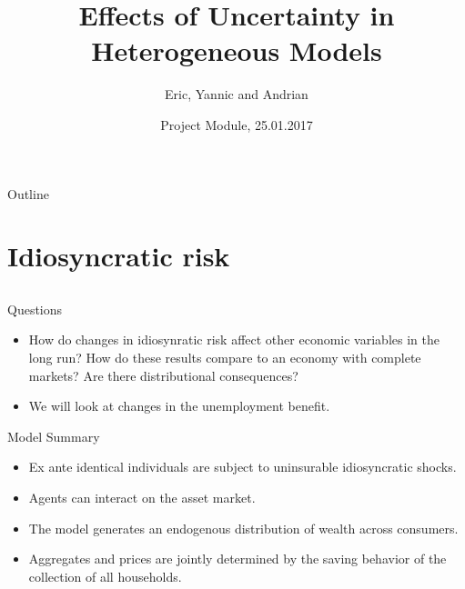 \documentclass{beamer}
\title{Effects of Uncertainty in Heterogeneous Models}
\subtitle{}
\author{Eric, Yannic and Andrian}
\date{Project Module, 25.01.2017}
\begin{document}
\begin{frame}
  \titlepage
\end{frame}

\begin{frame}{Outline}
  \tableofcontents
\end{frame}

\section{Idiosyncratic risk}
\subsection{}
\begin{frame}{Questions}
  \begin{itemize}
  
  \item {
How do changes in idiosynratic risk affect other economic variables in the long run? How do these results compare to an economy with complete markets? Are there distributional consequences?
  }

  \pause

  \item {
  We will look at changes in the unemployment benefit. 
  }
  
  \end{itemize}
\end{frame}




\begin{frame}{Model Summary}
  \begin{itemize}
  
  \item {
  Ex ante identical individuals are subject to uninsurable idiosyncratic shocks. 
  }
  \item {
Agents can interact on the asset market.
  }
  \item {
The model generates an endogenous distribution of wealth across consumers. 
  } 
  \item {
Aggregates and prices are jointly determined by the saving behavior of the collection of all households. 
}

  \end{itemize}

\end{frame}
\end{document}
